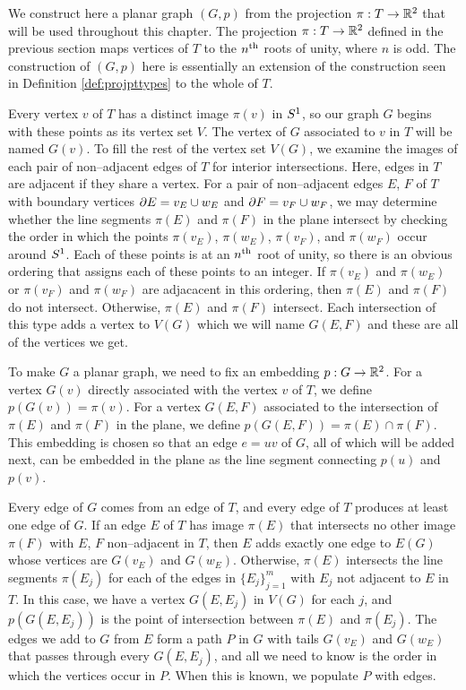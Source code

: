 \label{alg:planar}

We construct here a planar graph $(G,p)$ from the projection $\pi:T\to\mathbb{R}^2$ that will be used throughout this chapter.
The projection $\pi:T\to\mathbb{R}^2$ defined in the previous section maps vertices of $T$ to the $n^{\text{th}}$ roots of unity, where $n$ is odd.
The construction of $(G,p)$ here is essentially an extension of the construction seen in Definition \ref{def:projpttypes} to the whole of $T$.

Every vertex $v$ of $T$ has a distinct image $\pi(v)$ in $S^1$, so our graph $G$ begins with these points as its vertex set $V$.
The vertex of $G$ associated to $v$ in $T$ will be named $G(v)$.
To fill the rest of the vertex set $V(G)$, we examine the images of each pair of non--adjacent edges of $T$ for interior intersections.
Here, edges in $T$ are adjacent if they share a vertex.
For a pair of non--adjacent edges $E$, $F$ of $T$ with boundary vertices $\partial E = v_E\cup w_E$ and $\partial F = v_F\cup w_F$, we may determine whether the line segments $\pi(E)$ and $\pi(F)$ in the plane intersect by checking the order in which the points $\pi(v_E)$, $\pi(w_E)$, $\pi(v_F)$, and $\pi(w_F)$ occur around $S^1$.
Each of these points is at an $n^{\text{th}}$ root of unity, so there is an obvious ordering that assigns each of these points to an integer.
If $\pi(v_E)$ and $\pi(w_E)$ or $\pi(v_F)$ and $\pi(w_F)$ are adjacacent in this ordering, then $\pi(E)$ and $\pi(F)$ do not intersect.
Otherwise, $\pi(E)$ and $\pi(F)$ intersect.
Each intersection of this type adds a vertex to $V(G)$ which we will name $G(E, F)$ and these are all of the vertices we get.

To make $G$ a planar graph, we need to fix an embedding $p:G\to\mathbb{R}^2$.
For a vertex $G(v)$ directly associated with the vertex $v$ of $T$, we define $p(G(v))=\pi(v)$.
For a vertex $G(E,F)$ associated to the intersection of $\pi(E)$ and $\pi(F)$ in the plane, we define $p(G(E,F))=\pi(E)\cap\pi(F)$.
This embedding is chosen so that an edge $e=uv$ of $G$, all of which will be added next, can be embedded in the plane as the line segment connecting $p(u)$ and $p(v)$.

Every edge of $G$ comes from an edge of $T$, and every edge of $T$ produces at least one edge of $G$.
If an edge $E$ of $T$ has image $\pi(E)$ that intersects no other image $\pi(F)$ with $E$, $F$ non--adjacent in $T$, then $E$ adds exactly one edge to $E(G)$ whose vertices are $G(v_E)$ and $G(w_E)$.
Otherwise, $\pi(E)$ intersects the line segments $\pi(E_j)$ for each of the edges in $\{E_j\}_{j=1}^m$ with $E_j$ not adjacent to $E$ in $T$.
In this case, we have a vertex $G(E,E_j)$ in $V(G)$ for each $j$, and $p(G(E,E_j))$ is the point of intersection between $\pi(E)$ and $\pi(E_j)$.
The edges we add to $G$ from $E$ form a path $P$ in $G$ with tails $G(v_E)$ and $G(w_E)$ that passes through every $G(E,E_j)$, and all we need to know is the order in which the vertices occur in $P$.
When this is known, we populate $P$ with edges.

